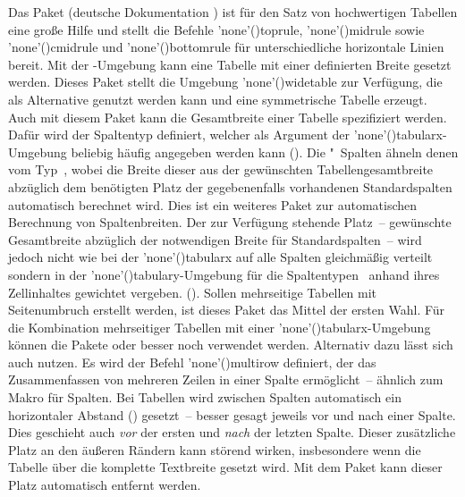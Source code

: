 \begin{DeclarePackages}[Tabellen|?]
  Das Paket  (deutsche Dokumentation ) 
  ist für den Satz von hochwertigen Tabellen eine große Hilfe und stellt die 
  Befehle \Macro'none'(){toprule}, 
  \Macro'none'(){midrule} sowie 
  \Macro'none'(){cmidrule} und 
  \Macro'none'(){bottomrule}
  für unterschiedliche horizontale Linien bereit.
  Mit der -Umgebung  kann eine 
  Tabelle mit einer definierten Breite gesetzt werden. Dieses Paket stellt die 
  Umgebung \Environment'none'(){widetable} zur Verfügung, 
  die als Alternative genutzt werden kann und eine symmetrische Tabelle erzeugt.
  Auch mit diesem Paket kann die Gesamtbreite einer Tabelle spezifiziert 
  werden. Dafür wird der Spaltentyp  definiert, welcher als Argument 
  der \Environment'none'(){tabularx}-Umgebung beliebig 
  häufig angegeben werden kann 
  (). 
  Die "~Spalten ähneln denen vom Typ~, 
  wobei die Breite dieser aus der gewünschten Tabellengesamtbreite abzüglich 
  dem benötigten Platz der gegebenenfalls vorhandenen Standardspalten 
  automatisch berechnet wird.
  Dies ist ein weiteres Paket zur automatischen Berechnung von Spaltenbreiten. 
  Der zur Verfügung stehende Platz~-- gewünschte Gesamtbreite abzüglich der 
  notwendigen Breite für Standardspalten~-- wird jedoch nicht wie bei der 
  \Environment'none'(){tabularx} auf alle Spalten 
  gleichmäßig verteilt sondern in der 
  \Environment'none'(){tabulary}-Umgebung für die 
  Spaltentypen~ anhand ihres Zellinhaltes gewichtet vergeben. 
  (). 
  Sollen mehrseitige Tabellen mit Seitenumbruch erstellt werden, ist dieses 
  Paket das Mittel der ersten Wahl. Für die Kombination mehrseitiger Tabellen 
  mit einer \Environment'none'(){tabularx}-Umgebung können 
  die Pakete  oder besser noch  verwendet 
  werden. Alternativ dazu lässt sich auch  nutzen.
  Es wird der Befehl \Macro'none'(){multirow} definiert, der 
  das Zusammenfassen von mehreren Zeilen in einer Spalte ermöglicht~-- ähnlich 
  zum Makro  für Spalten.
  Bei Tabellen wird zwischen Spalten automatisch ein horizontaler Abstand 
  () gesetzt~-- besser gesagt jeweils vor und nach einer 
  Spalte. Dies geschieht auch \emph{vor} der ersten und \emph{nach} der letzten 
  Spalte. Dieser zusätzliche Platz an den äußeren Rändern kann störend wirken, 
  insbesondere wenn die Tabelle über die komplette Textbreite gesetzt wird. Mit 
  dem Paket  kann dieser Platz automatisch entfernt 
  werden.
  

\end{DeclarePackages}
